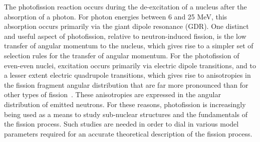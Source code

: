 \label{sec:level1}
The photofission reaction occurs during the de-excitation of a nucleus after the absorption of a photon.
For photon energies between 6 and 25 MeV, this absorption occurs primarily via the giant dipole resonance (GDR).
One distinct and useful aspect of photofission, relative to neutron-induced fission, is the low transfer of angular momentum to the nucleus, which gives rise to a simpler set of selection rules for the transfer of angular momentum.
For the photofission of even-even nuclei, excitation occurs primarily via electric dipole transitions, and to a lesser extent electric quadrupole transitions, which gives rise to anisotropies in the fission fragment angular distribution that are far more pronounced than for other types of fission~\cite{1977FragAss}.
These anisotropies are expressed in the angular distribution of emitted neutrons.
For these reasons, photofission is increasingly being used as a means to study sub-nuclear structures and the fundamentals of the fission process.
Such studies are needed in order to dial in various model parameters required for an accurate theoretical description of the fission process.
